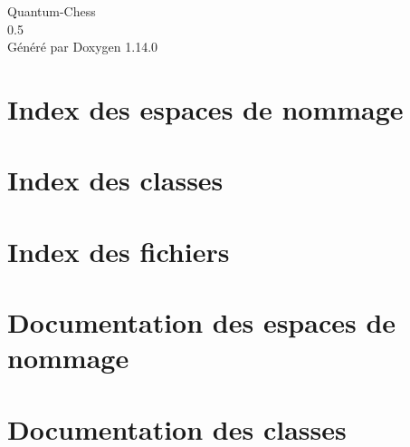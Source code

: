 \documentclass[twoside]{book}
\newcommand{\+}{\discretionary{\mbox{\scriptsize$\hookleftarrow$}}{}{}}
\newcommand{\clearemptydoublepage}{%
    \newpage{\pagestyle{empty}\cleardoublepage}%
  }
\begin{document}
  \raggedbottom
    \hypersetup{pageanchor=false,
                bookmarksnumbered=true,
                pdfencoding=unicode
               }
  \begin{titlepage}
  \vspace*{7cm}
  \begin{center}%
  {\Large Quantum-\/\+Chess}\\
  [1ex]\large 0.\+5 \\
  \vspace*{1cm}
  {\large Généré par Doxygen 1.14.0}\\
  \end{center}
  \end{titlepage}
  \clearemptydoublepage
  \tableofcontents
  \clearemptydoublepage
  \hypersetup{pageanchor=true}
\chapter{Index des espaces de nommage}

\chapter{Index des classes}

\chapter{Index des fichiers}

\chapter{Documentation des espaces de nommage}





\chapter{Documentation des classes}







\end{document}
